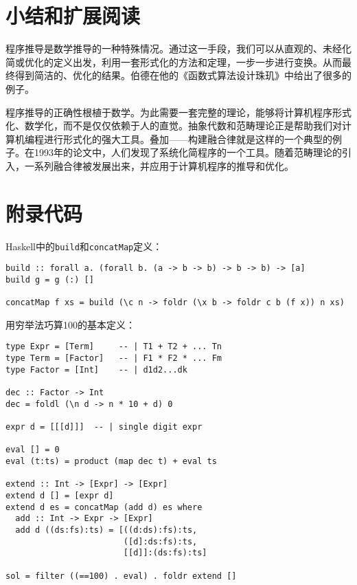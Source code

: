 \documentclass{article}
\begin{document}
\begin{Exercise}
\end{Exercise}

\section{小结和扩展阅读}

程序推导是数学推导的一种特殊情况。通过这一手段，我们可以从直观的、未经化简或优化的定义出发，利用一套形式化的方法和定理，一步一步进行变换。从而最终得到简洁的、优化的结果。伯德在他的《函数式算法设计珠玑》\cite{Bird-2010}中给出了很多的例子。

程序推导的正确性根植于数学。为此需要一套完整的理论，能够将计算机程序形式化、数学化，而不是仅仅依赖于人的直觉。抽象代数和范畴理论正是帮助我们对计算机编程进行形式化的强大工具。叠加——构建融合律就是这样的一个典型的例子。在1993年的论文\cite{GLPJ-1993}中，人们发现了系统化简程序的一个工具。随着范畴理论的引入，一系列融合律被发展出来\cite{Hinze-Harper-James-2010}，并应用于计算机程序的推导和优化。

\section{附录代码}

Haskell中的\texttt{build}和\texttt{concatMap}定义：

\lstset{frame=single}
\begin{lstlisting}
build :: forall a. (forall b. (a -> b -> b) -> b -> b) -> [a]
build g = g (:) []

concatMap f xs = build (\c n -> foldr (\x b -> foldr c b (f x)) n xs)
\end{lstlisting}

用穷举法巧算100的基本定义：
\begin{lstlisting}
type Expr = [Term]     -- | T1 + T2 + ... Tn
type Term = [Factor]   -- | F1 * F2 * ... Fm
type Factor = [Int]    -- | d1d2...dk

dec :: Factor -> Int
dec = foldl (\n d -> n * 10 + d) 0

expr d = [[[d]]]  -- | single digit expr

eval [] = 0
eval (t:ts) = product (map dec t) + eval ts

extend :: Int -> [Expr] -> [Expr]
extend d [] = [expr d]
extend d es = concatMap (add d) es where
  add :: Int -> Expr -> [Expr]
  add d ((ds:fs):ts) = [((d:ds):fs):ts,
                        ([d]:ds:fs):ts,
                        [[d]]:(ds:fs):ts]

sol = filter ((==100) . eval) . foldr extend []
\end{lstlisting}
\end{document}
